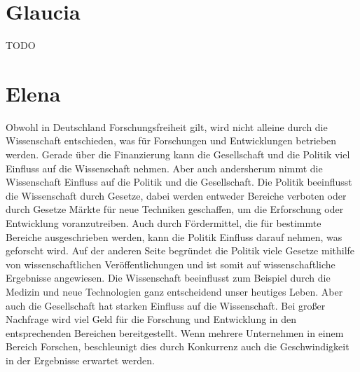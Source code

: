 \documentclass{pmwk}
\begin{document}
\Abgabeblatt{}{}{}{}




\section*{Glaucia}
TODO
\section*{Elena}
Obwohl in Deutschland Forschungsfreiheit gilt, wird nicht alleine durch die Wissenschaft entschieden, was für Forschungen und Entwicklungen betrieben werden. Gerade über die Finanzierung kann die Gesellschaft und die Politik viel Einfluss auf die Wissenschaft nehmen. Aber auch andersherum nimmt die Wissenschaft Einfluss auf die Politik und die Gesellschaft. 
Die Politik beeinflusst die Wissenschaft durch Gesetze, dabei werden entweder Bereiche verboten oder durch Gesetze Märkte für neue Techniken geschaffen, um die Erforschung oder Entwicklung voranzutreiben. Auch durch Fördermittel, die für bestimmte Bereiche ausgeschrieben werden, kann die Politik Einfluss darauf nehmen, was geforscht wird. Auf der anderen Seite begründet die Politik viele Gesetze mithilfe von wissenschaftlichen Veröffentlichungen und ist somit auf wissenschaftliche Ergebnisse angewiesen. 
Die Wissenschaft beeinflusst zum Beispiel durch die Medizin und neue Technologien ganz entscheidend unser heutiges Leben. Aber auch die Gesellschaft hat starken Einfluss auf die Wissenschaft. Bei großer Nachfrage wird viel Geld für die Forschung und Entwicklung in den entsprechenden Bereichen bereitgestellt. Wenn mehrere Unternehmen in einem Bereich Forschen, beschleunigt dies durch Konkurrenz auch die Geschwindigkeit in der Ergebnisse erwartet werden. 
\end{document}
